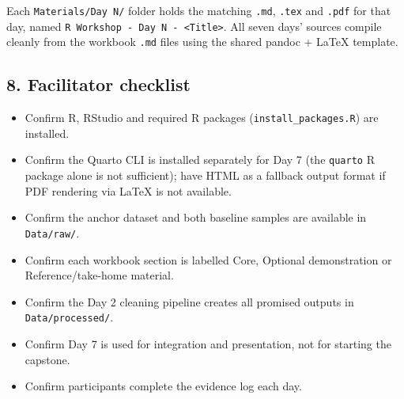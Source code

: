 \documentclass[11pt]{article}
\providecommand{\tightlist}{%
  \setlength{\itemsep}{0pt}\setlength{\parskip}{0pt}}
\begin{document}
Each \texttt{Materials/Day\ N/} folder holds the matching \texttt{.md},
\texttt{.tex} and \texttt{.pdf} for that day, named
\texttt{R\ Workshop\ -\ Day\ N\ -\ \textless{}Title\textgreater{}}. All
seven days' sources compile cleanly from the workbook \texttt{.md} files
using the shared pandoc + LaTeX template.

\hypertarget{facilitator-checklist}{%
\subsection{8. Facilitator checklist}\label{facilitator-checklist}}

\begin{itemize}
\tightlist
\item
  Confirm R, RStudio and required R packages
  (\texttt{install\_packages.R}) are installed.
\item
  Confirm the Quarto CLI is installed separately for Day 7 (the
  \texttt{quarto} R package alone is not sufficient); have HTML as a
  fallback output format if PDF rendering via LaTeX is not available.
\item
  Confirm the anchor dataset and both baseline samples are available in
  \texttt{Data/raw/}.
\item
  Confirm each workbook section is labelled Core, Optional demonstration
  or Reference/take-home material.
\item
  Confirm the Day 2 cleaning pipeline creates all promised outputs in
  \texttt{Data/processed/}.
\item
  Confirm Day 7 is used for integration and presentation, not for
  starting the capstone.
\item
  Confirm participants complete the evidence log each day.
\end{itemize}
\end{document}
